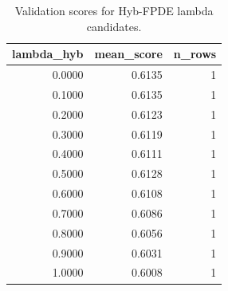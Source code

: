 \begin{table}[t]
\caption{Validation scores for Hyb-FPDE lambda candidates.}
\label{tab:lambda_distribution_computed}
\centering
\begin{tabular}{rrr}
\toprule
lambda\_hyb & mean\_score & n\_rows \\
\midrule
0.0000 & 0.6135 & 1 \\
0.1000 & 0.6135 & 1 \\
0.2000 & 0.6123 & 1 \\
0.3000 & 0.6119 & 1 \\
0.4000 & 0.6111 & 1 \\
0.5000 & 0.6128 & 1 \\
0.6000 & 0.6108 & 1 \\
0.7000 & 0.6086 & 1 \\
0.8000 & 0.6056 & 1 \\
0.9000 & 0.6031 & 1 \\
1.0000 & 0.6008 & 1 \\
\bottomrule
\end{tabular}

\end{table}
